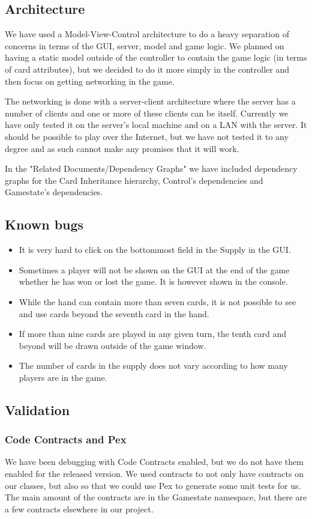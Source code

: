 \documentclass[12pt,a4paper,notitlepage]{article}
\begin{document}
\subsection{Architecture}
We have used a Model-View-Control architecture to do a heavy separation of concerns in terms of the GUI, server, model and game logic. We planned on having a static model outside of the controller to contain the game logic (in terms of card attributes), but we decided to do it more simply in the controller and then focus on getting networking in the game. 

The networking is done with a server-client architecture where the server has a number of clients and one or more of these clients can be itself. Currently we have only tested it on the server's local machine and on a LAN with the server. It should be possible to play over the Internet, but we have not tested it to any degree and as such cannot make any promises that it will work.

In the "Related Documents/Dependency Graphs" we have included dependency graphs for the Card Inheritance hierarchy, Control's dependencies and Gamestate's dependencies.

\subsection{Known bugs}
\begin{itemize}
\item It is very hard to click on the bottommost field in the Supply in the GUI.
\item Sometimes a player will not be shown on the GUI at the end of the game whether he has won or lost the game. It is however shown in the console.
\item While the hand can contain more than seven cards, it is not possible to see and use cards beyond the seventh card in the hand.
\item If more than nine cards are played in any given turn, the tenth card and beyond will be drawn outside of the game window.
\item The number of cards in the supply does not vary according to how many players are in the game.
\end{itemize}

\subsection{Validation}
\subsubsection{Code Contracts and Pex}
We have been debugging with Code Contracts enabled, but we do not have them enabled for the released version. We used contracts to not only have contracts on our classes, but also so that we could use Pex to generate some unit tests for us. The main amount of the contracts are in the Gamestate namespace, but there are a few contracts elsewhere in our project.
\end{document}
